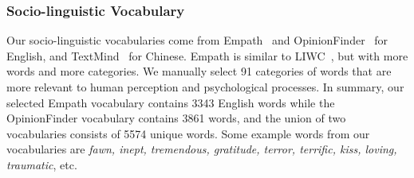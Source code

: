 \subsubsection{Socio-linguistic Vocabulary}
\label{sec:sv}
Our socio-linguistic vocabularies come from 
Empath~\cite{fast2016empath} and OpinionFinder~\cite{choi2005identifying} 
for English, and TextMind~\cite{gao2013developing} for Chinese.
Empath is similar to LIWC~\cite{pennebaker2001linguistic},
but with more words and more categories. 
We manually select 91 categories of words that are more 
relevant to human perception and psychological processes. 
%
In summary, our selected Empath vocabulary contains 3343 English words 
while the OpinionFinder vocabulary contains 3861 words, 
and the union of two vocabularies consists of 5574 unique words. 
Some example words from our vocabularies are \textit{fawn, inept, tremendous, gratitude, 
terror, terrific, kiss, loving, traumatic}, etc.




